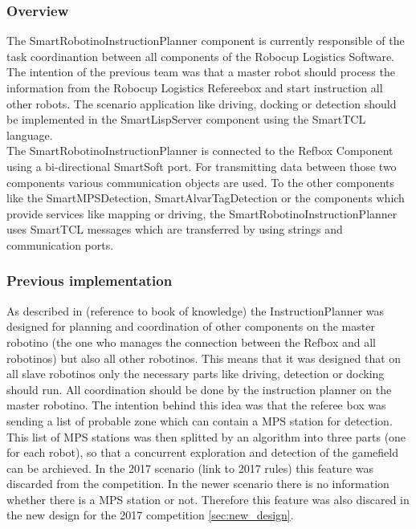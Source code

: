 \subsubsection{Overview}

The SmartRobotinoInstructionPlanner component is currently responsible of the task coordinantion between all components of the Robocup Logistics Software. The intention of the previous team was that a master robot should process the information from the Robocup Logistics Refereebox and start instruction all other robots. The scenario application like driving, docking or detection should be implemented in the SmartLispServer component using the SmartTCL language. \\

The SmartRobotinoInstructionPlanner is connected to the Refbox Component using a bi-directional SmartSoft port. For transmitting data between those two components various communication objects are used. To the other components like the SmartMPSDetection, SmartAlvarTagDetection or the components which provide services like mapping or driving, the SmartRobotinoInstructionPlanner uses SmartTCL messages which are transferred by using strings and communication ports. 


\subsubsection{Previous implementation}

As described in (reference to book of knowledge) the InstructionPlanner was designed for planning and coordination of other components on the master robotino (the one who manages the connection between the Refbox and all robotinos) but also all other robotinos. This means that it was designed that on all slave robotinos only the necessary parts like driving, detection or docking should run. All coordination should be done by the instruction planner on the master robotino. The intention behind this idea was that the referee box was sending a list of probable zone which can contain a MPS station for detection. This list of MPS stations was then splitted by an algorithm into three parts (one for each robot), so that a concurrent exploration and detection of the gamefield can be archieved. In the 2017 scenario (link to 2017 rules) this feature was discarded from the competition. In the newer scenario there is no information whether there is a MPS station or not. Therefore this feature was also discared in the new design for the 2017 competition \ref{sec:new_design}.  \\




